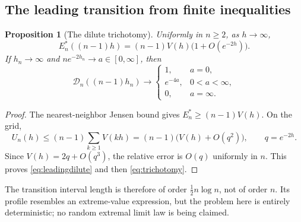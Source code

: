 \documentclass[11pt,a4paper]{article}
\newtheorem{proposition}[theorem]{Proposition}
\theoremstyle{definition}
\theoremstyle{remark}
\newcommand{\Dopt}{\mathcal D}
\begin{document}
\subsection{The leading transition from finite inequalities}
\begin{proposition}[The dilute trichotomy]
\label{prop:trichotomy}
Uniformly in $n\ge2$, as $h\to\infty$,
\begin{equation}
 E_n^*((n-1)h)=(n-1)V(h)\bigl(1+O(e^{-2h})\bigr).
 \label{eq:leadingdilute}
\end{equation}
If $h_n\to\infty$ and $ne^{-2h_n}\to a\in[0,\infty]$, then
\begin{equation}
 \Dopt_n((n-1)h_n)\longrightarrow
 \begin{cases}
  1,&a=0,\\
  e^{-4a},&0<a<\infty,\\
  0,&a=\infty.
 \end{cases}
 \label{eq:trichotomy}
\end{equation}
\end{proposition}
\begin{proof}
The nearest-neighbor Jensen bound gives
$E_n^*\ge(n-1)V(h)$. On the grid,
\[
 U_n(h)\le(n-1)\sum_{k\ge1}V(kh)
 =(n-1)\bigl(V(h)+O(q^2)\bigr),\qquad q=e^{-2h}.
\]
Since $V(h)=2q+O(q^3)$, the relative error is $O(q)$ uniformly in $n$.
This proves \eqref{eq:leadingdilute} and then \eqref{eq:trichotomy}.
\end{proof}

The transition interval length is therefore of order
$\tfrac12n\log n$, not of order $n$. Its profile resembles an
extreme-value expression, but the problem here is entirely deterministic;
no random extremal limit law is being claimed.
\end{document}
